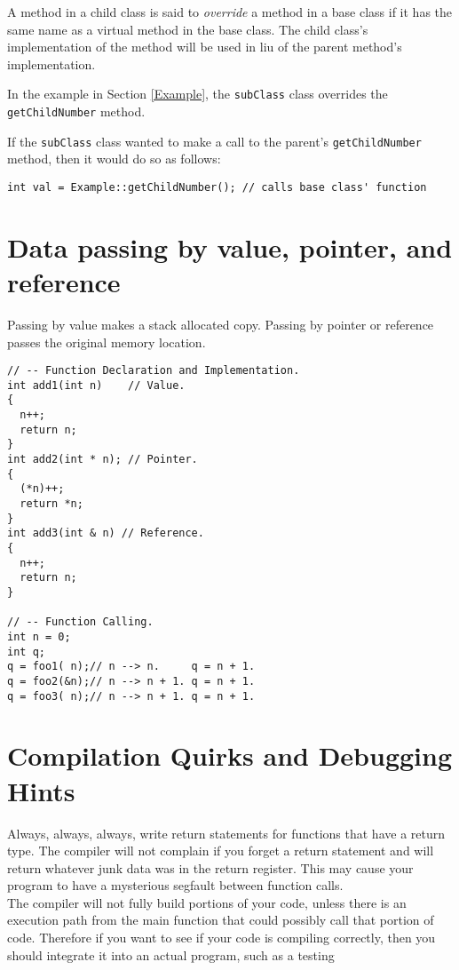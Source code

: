 \documentclass[12pt, letterpaper]{article}
\begin{document}
A method in a child class is said to \textit{override} a method in a base class if it has the same name as a virtual method in the base class. The child class's implementation of the method will be used in liu of the parent method's implementation. 

In the example in Section \ref{Example}, the \texttt{subClass} class overrides the \texttt{getChildNumber} method.

If the \texttt{subClass} class wanted to make a call to the parent's \texttt{getChildNumber} method, then it would do so as follows:
\begin{verbatim}
int val = Example::getChildNumber(); // calls base class' function
\end{verbatim}

\section{Data passing by value, pointer, and reference}

Passing by value makes a stack allocated copy. Passing by pointer or reference passes the original memory location.

\begin{verbatim}
// -- Function Declaration and Implementation.
int add1(int n)    // Value.
{
  n++;
  return n;
}
int add2(int * n); // Pointer.
{
  (*n)++;
  return *n;
}
int add3(int & n) // Reference.
{
  n++;
  return n;
}

// -- Function Calling.
int n = 0;
int q;
q = foo1( n);// n --> n.     q = n + 1.
q = foo2(&n);// n --> n + 1. q = n + 1.
q = foo3( n);// n --> n + 1. q = n + 1.
\end{verbatim}

\section{Compilation Quirks and Debugging Hints}

Always, always, always, write return statements for functions that have a return type. The compiler will not complain if you forget a return statement and will return whatever junk data was in the return register. This may cause your program to have a mysterious segfault between function calls.\\

The compiler will not fully build portions of your code, unless there is an execution path from the main function that could possibly call that portion of code. Therefore if you want to see if your code is compiling correctly, then you should integrate it into an actual program, such as a testing 
\end{document}
